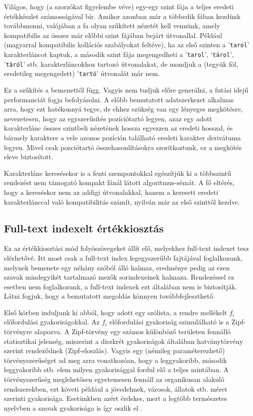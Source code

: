 \documentclass[
    parspace,
    noindent,
    nohyp,
]{elteiktdk}[2023/04/10]
\begin{document}
Világos, hogy (a szorzókat figyelembe véve) egy-egy szint fája
a teljes eredeti értékkészlet számosságával bír.
Amikor azonban már a többedik fában kezdünk továbbmenni,
valójában a fa olyan szűkített nézetét kell vennünk,
amely kompatibilis az összes már előbbi szint fájában bejárt útvonallal.
Például (magyarral kompatibilis kollációs szabályokat feltéve),
ha az első szinten a '\texttt{tarol}' karakterláncot kaptuk,
a második szint fája megengedheti a '\texttt{tarol}', `\texttt{tárol}', '\texttt{táról}' stb.
karakterláncokhoz tartozó útvonalakat,
de mondjuk a (tegyük föl, eredetileg megengedett) '\texttt{tartó}' útvonalát már nem.

Ez a szűkítés a bemenettől függ.
Vagyis nem tudjuk előre generálni, a futási idejű performanciát fogja befolyásolni.
A előbb bemutatott adatszerkezet alkalmas arra, hogy ezt hatékonnyá tegye,
de ehhez szükség van egy lényeges megkötésre,
nevezetesen, hogy az egyszerűsítés pozíciótartó legyen,
azaz egy adott karakterlánc összes szintbeli nézetének hossza egyezzen az eredeti hosszal,
és bármely karaktere a vele azonos pozíción található eredeti karakter derivátuma legyen.
Mivel csak pozciótartó összehasonlításokra szorítkoztunk,
ez a megkötés eleve biztosított.

Karakterlánc keresésekor is a fenti szempontokkal egészítjük ki
a többszintű rendezést nem támogató kompakt fánál látott algoritmus-sémát.
A fő eltérés, hogy a kereséskor nem az addigi útvonalakkal,
hanem a keresett eredeti karakterlánccal való kompatibilitás számít,
nyilván már az első szinttől kezdve.

\subsection{Full-text indexelt értékkiosztás}

Ez az értékkiosztási mód folyószövegeket állít elő, melyekhez full-text indexet tesz elérhetővé.
Itt most csak a full-text index legegyszerűbb fajtájával foglalkozunk,
melynek bemenete egy néhány szóból álló halmaz,
eredménye pedig az ezen szavak mindegyikét tartalmazó mezők sorindexeinek halmaza.
Rendezéssel ez esetben nem foglalkozunk, a full-text indexek ezt általában nem is biztosítják.
Látni fogjuk, hogy a bemutatott megoldás könnyen továbbfejleszthető.

Első körben induljunk ki abból, hogy adott egy szólista, a rendre mellékelt $f_i$ előfordulási gyakoriságokkal.
Az $f_i$ előfordulási gyakoriság szimulálható is a Zipf-törvényre alapozva.
A Zipf-törvény egy számos különböző területen fennálló statisztikai jelenség,
miszerint a diszkrét gyakoriságok általában hatványtörvény szerint rendeződnek (Zipf-eloszlás).
Vagyis egy (némileg paraméterezhető) törvényszerűséget ad meg arra vonatkozóan,
hogy a leggyakoribb, második leggyakoribb stb. elem
milyen gyakorisággal fordul elő a teljes mintában.
A törvényszerűség meglehetősen egyetemesen fennáll az organikusan alakuló rendszerekben,
ezt követi például a jövedelmek, városok, állatok stb. méret szerinti gyakorisága.
Esetünkben azért érdekes, mert a legtöbb természetes nyelvben a szavak gyakorisága is így oszlik el%
\cite{Zipf1942UnityOfNature}.
\end{document}
